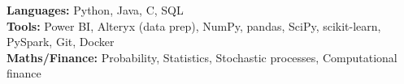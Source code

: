 \textbf{Languages:} Python, Java, C, SQL\\
\textbf{Tools:} Power BI, Alteryx (data prep), NumPy, pandas, SciPy, scikit-learn, PySpark, Git, Docker\\
\textbf{Maths/Finance:} Probability, Statistics, Stochastic processes, Computational finance
